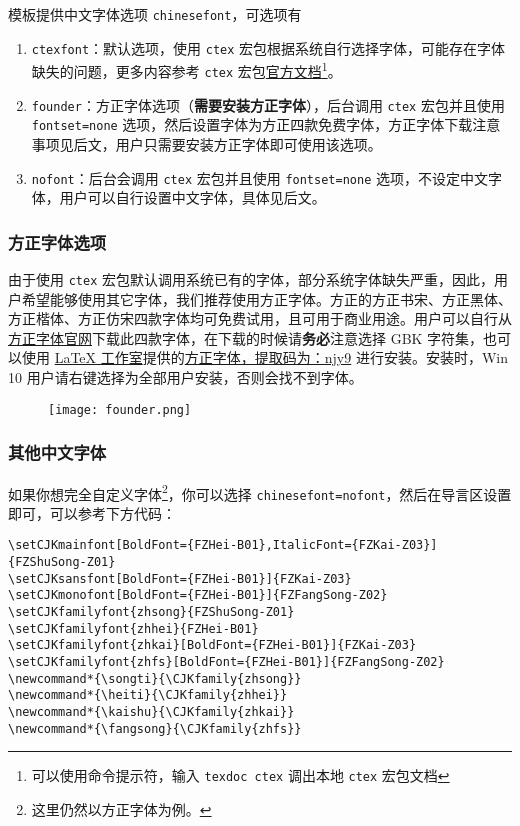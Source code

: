 \documentclass[lang=cn,a4paper]{elegantpaper}
\begin{document}
模板提供中文字体选项 \lstinline{chinesefont}，可选项有
\begin{enumerate}
  \item \lstinline{ctexfont}：默认选项，使用 \lstinline{ctex} 宏包根据系统自行选择字体，可能存在字体缺失的问题，更多内容参考 \lstinline{ctex} 宏包\href{https://ctan.org/pkg/ctex}{官方文档}\footnote{可以使用命令提示符，输入 \lstinline{texdoc ctex} 调出本地 \lstinline{ctex} 宏包文档}。
  \item \lstinline{founder}：方正字体选项（\textbf{需要安装方正字体}），后台调用 \lstinline{ctex} 宏包并且使用 \lstinline{fontset=none} 选项，然后设置字体为方正四款免费字体，方正字体下载注意事项见后文，用户只需要安装方正字体即可使用该选项。
  \item \lstinline{nofont}：后台会调用 \lstinline{ctex} 宏包并且使用 \lstinline{fontset=none} 选项，不设定中文字体，用户可以自行设置中文字体，具体见后文。
\end{enumerate}

\subsubsection{方正字体选项}
由于使用 \lstinline{ctex} 宏包默认调用系统已有的字体，部分系统字体缺失严重，因此，用户希望能够使用其它字体，我们推荐使用方正字体。方正的{\songti 方正书宋}、{\heiti 方正黑体}、{\kaishu 方正楷体}、{\fangsong 方正仿宋}四款字体均可免费试用，且可用于商业用途。用户可以自行从\href{http://www.foundertype.com/}{方正字体官网}下载此四款字体，在下载的时候请\textbf{务必}注意选择 GBK 字符集，也可以使用 \href{https://www.latexstudio.net/}{\LaTeX{} 工作室}提供的\href{https://pan.baidu.com/s/1BgbQM7LoinY7m8yeP25Y7Q}{方正字体，提取码为：njy9} 进行安装。安装时，{\kaishu Win 10 用户请右键选择为全部用户安装，否则会找不到字体。}

\begin{figure}[!htb]
\centering
\texttt{[image: founder.png]}
\end{figure}

\subsubsection{其他中文字体}
如果你想完全自定义字体\footnote{这里仍然以方正字体为例。}，你可以选择 \lstinline{chinesefont=nofont}，然后在导言区设置即可，可以参考下方代码：
\begin{lstlisting}
\setCJKmainfont[BoldFont={FZHei-B01},ItalicFont={FZKai-Z03}]{FZShuSong-Z01}
\setCJKsansfont[BoldFont={FZHei-B01}]{FZKai-Z03}
\setCJKmonofont[BoldFont={FZHei-B01}]{FZFangSong-Z02}
\setCJKfamilyfont{zhsong}{FZShuSong-Z01}
\setCJKfamilyfont{zhhei}{FZHei-B01}
\setCJKfamilyfont{zhkai}[BoldFont={FZHei-B01}]{FZKai-Z03}
\setCJKfamilyfont{zhfs}[BoldFont={FZHei-B01}]{FZFangSong-Z02}
\newcommand*{\songti}{\CJKfamily{zhsong}}
\newcommand*{\heiti}{\CJKfamily{zhhei}}
\newcommand*{\kaishu}{\CJKfamily{zhkai}}
\newcommand*{\fangsong}{\CJKfamily{zhfs}}
\end{lstlisting}
\end{document}
